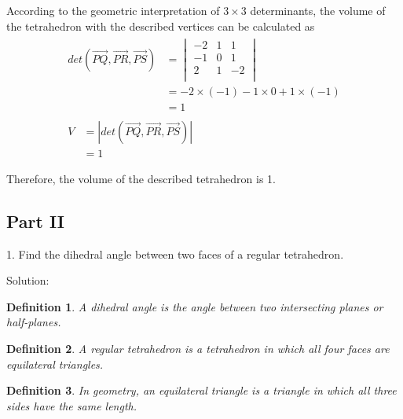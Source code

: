 \documentclass{article}
\newtheorem*{definition}{Definition}
\begin{document}
According to the geometric interpretation of $3 \times 3$ determinants, the 
volume of the tetrahedron with the described vertices can be calculated as
\begin{gather*}
  \begin{split}
    det(\vec{PQ}, \vec{PR}, \vec{PS}) 
    &= \begin{vmatrix}
         -2 & 1 & 1 \\
         -1 & 0 & 1 \\
         2 & 1 & -2 \\
       \end{vmatrix} \\
    &= -2 \times (-1) - 1 \times 0 + 1 \times (-1) \\
    &= 1
  \end{split} \\
  \begin{split}
    V &= |det(\vec{PQ}, \vec{PR}, \vec{PS})| \\
      &= 1 \\
  \end{split} \\
\end{gather*}
Therefore, the volume of the described tetrahedron is 1.

\begin{center}
\section*{Part II}
\end{center}

1. Find the dihedral angle between two faces of a regular tetrahedron.

Solution:

\begin{definition}
  A dihedral angle is the angle between two intersecting planes or half-planes.
\end{definition}

\begin{definition}
  A regular tetrahedron is a tetrahedron in which all four faces are equilateral 
  triangles.
\end{definition}

\begin{definition}
  In geometry, an equilateral triangle is a triangle in which all three sides 
  have the same length.
\end{definition}

\end{document}
